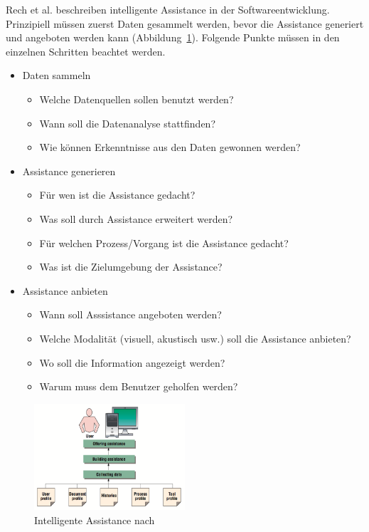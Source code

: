 \documentclass[
	headsepline,
	footsepline,
	fontsize=12pt,
	bibliography=totoc
]{scrbook}
\begin{document}

Rech et al. \cite{Rech2007} beschreiben intelligente Assistance in der Softwareentwicklung. Prinzipiell müssen zuerst Daten gesammelt werden, bevor die Assistance generiert und angeboten werden kann (Abbildung~\ref{figure:intelligent_assistance}). Folgende Punkte müssen in den einzelnen Schritten beachtet werden.

\begin{itemize}

	\item Daten sammeln
	\begin{itemize}
		\item Welche Datenquellen sollen benutzt werden?
		\item Wann soll die Datenanalyse stattfinden?
		\item Wie können Erkenntnisse aus den Daten gewonnen werden?
	\end{itemize}
	\item Assistance generieren
	\begin{itemize}
		\item Für wen ist die Assistance gedacht?
		\item Was soll durch Assistance erweitert werden?
		\item Für welchen Prozess/Vorgang ist die Assistance gedacht?
		\item Was ist die Zielumgebung der Assistance?
	\end{itemize}
	\item Assistance anbieten
	\begin{itemize}
		\item Wann soll Asssistance angeboten werden?
		\item Welche Modalität (visuell, akustisch usw.) soll die Assistance anbieten?
		\item Wo soll die Information angezeigt werden?
		\item Warum muss dem Benutzer geholfen werden?
	\end{itemize}
\end{itemize}

\begin{figure}[htbp]
   \centering
   \includegraphics[width=0.5\textwidth]{images/grundlagen-intelligent_assistance.png}
   \caption{Intelligente Assistance nach \cite{Rech2007}}
   \label{figure:intelligent_assistance}
\end{figure}
\end{document}

